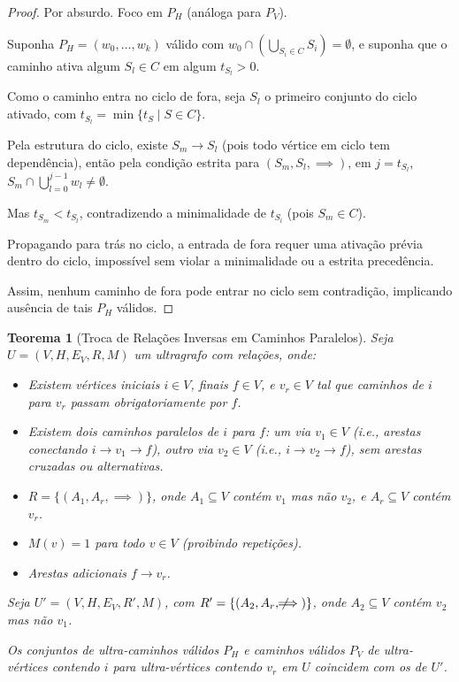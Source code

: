 \documentclass{article}
\newtheorem{theorem}{Teorema}
\begin{document}
\begin{proof}
Por absurdo. Foco em \( P_H \) (análoga para \( P_V \)).

Suponha \( P_H = (w_0, \dots, w_k) \) válido com \( w_0 \cap \left( \bigcup_{S_i \in C} S_i \right) = \emptyset \), e suponha que o caminho ativa algum \( S_l \in C \) em algum \( t_{S_l} > 0 \).

Como o caminho entra no ciclo de fora, seja \( S_l \) o primeiro conjunto do ciclo ativado, com \( t_{S_l} = \min \{ t_S \mid S \in C \} \).

Pela estrutura do ciclo, existe \( S_m \to S_l \) (pois todo vértice em ciclo tem dependência), então pela condição estrita para \( (S_m, S_l, \implies) \), em \( j = t_{S_l} \), \( S_m \cap \bigcup_{l=0}^{j-1} w_l \neq \emptyset \).

Mas \( t_{S_m} < t_{S_l} \), contradizendo a minimalidade de \( t_{S_l} \) (pois \( S_m \in C \)).

Propagando para trás no ciclo, a entrada de fora requer uma ativação prévia dentro do ciclo, impossível sem violar a minimalidade ou a estrita precedência.

Assim, nenhum caminho de fora pode entrar no ciclo sem contradição, implicando ausência de tais \( P_H \) válidos.
\end{proof}

\begin{theorem}[Troca de Relações Inversas em Caminhos Paralelos]
\hfill

Seja \( U = (V, H, E_V, R, M) \) um ultragrafo com relações, onde:

\begin{itemize}
    \item Existem vértices iniciais \( i \in V \), finais \( f \in V \), e \( v_r \in V \) tal que caminhos de \( i \) para \( v_r \) passam obrigatoriamente por \( f \).
    \item Existem dois caminhos paralelos de \( i \) para \( f \): um via \( v_1 \in V \) (i.e., arestas conectando \( i \to v_1 \to f \)), outro via \( v_2 \in V \) (i.e., \( i \to v_2 \to f \)), sem arestas cruzadas ou alternativas.
    \item \( R = \{ (A_1, A_r, \implies) \} \), onde \( A_1 \subseteq V \) contém \( v_1 \) mas não \( v_2 \), e \( A_r \subseteq V \) contém \( v_r \).
    \item \( M(v) = 1 \) para todo \( v \in V \) (proibindo repetições).
    \item Arestas adicionais \( f \to v_r \).
\end{itemize}

Seja \( U' = (V, H, E_V, R', M) \), com \( R' = \{ (A_2, A_r, \not\!\!\!\implies) \} \), onde \( A_2 \subseteq V \) contém \( v_2 \) mas não \( v_1 \).

Os conjuntos de ultra-caminhos válidos \( P_H \) e caminhos válidos \( P_V \) de ultra-vértices contendo \( i \) para ultra-vértices contendo \( v_r \) em \( U \) coincidem com os de \( U' \).
\end{theorem}
\end{document}
